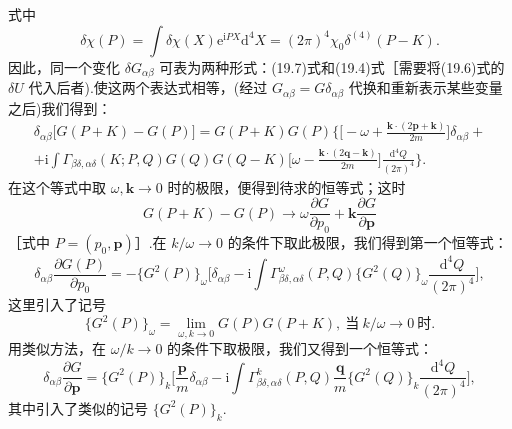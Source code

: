 式中
\begin{equation*}
  \delta\chi(P)=\int\delta\chi(X)\mathrm{e}^{\mathrm{i}PX}\mathrm{d}^4X=(2\pi)^4\chi_0\delta^{(4)}(P-K).
\end{equation*}
因此，同一个变化 $\delta G_{\alpha\beta}$ 可表为两种形式：(19.7)式和(19.4)式［需要将(19.6)式的 $\delta U$ 代入后者).使这两个表达式相等，(经过 $G_{\alpha\beta}=G\delta_{\alpha\beta}$ 代换和重新表示某些变量之后)我们得到：
\begin{equation*}
\begin{aligned}
  \delta_{\alpha\beta}\bigl[G(P+K)-G(P)\bigr]=G(P+K)G(P)\biggl\{\biggl[-\omega+\frac{\bm{k}\cdot(2\bm{p}+\bm{k})}{2m}\biggr]\delta_{\alpha\beta}+\\
  +\mathrm{i}\int\Gamma_{\beta\delta,\alpha\delta}(K;P,Q)G(Q)G(Q-K)\biggl[\omega-\frac{\bm{k}\cdot(2\bm{q}-\bm{k})}{2m}\biggr]\frac{\mathrm{d}^4Q}{(2\pi)^4}\biggr\}.
\end{aligned}
\end{equation*}
在这个等式中取 $\omega,\bm{k}\to0$ 时的极限，便得到待求的恒等式；这时
\begin{equation}
  G(P+K)-G(P)\longrightarrow\omega\frac{\partial G}{\partial p_0}+\bm{k}\frac{\partial G}{\partial\bm{p}}
\end{equation}
［式中 $P=(p_0,\bm{p})$］.在 $k/\omega\to0$ 的条件下取此极限，我们得到第一个恒等式：
\begin{equation}
  \delta_{\alpha\beta}\frac{\partial G(P)}{\partial p_0}
  =-\bigl\{G^2(P)\bigr\}_{\omega}\biggl[\delta_{\alpha\beta}-\mathrm{i}\int\Gamma^{\omega}_{\beta\delta,\alpha\delta}(P,Q)\bigl\{G^2(Q)\bigr\}_{\omega}\frac{\mathrm{d}^4Q}{(2\pi)^4}\biggr],
\end{equation}
这里引入了记号
\begin{equation}
  \bigl\{G^2(P)\bigr\}_{\omega}=\lim_{\omega,k\to0}G(P)G(P+K),\ \text{当}\ k/\omega\to0\ \text{时}.
\end{equation}
用类似方法，在 $\omega/k\to0$ 的条件下取极限，我们又得到一个恒等式：
\begin{equation}
  \delta_{\alpha\beta}\frac{\partial G}{\partial\bm{p}}
  =\bigl\{G^2(P)\bigr\}_{k}\biggl[\frac{\bm{p}}{m}\delta_{\alpha\beta}-\mathrm{i}\int\Gamma^{k}_{\beta\delta,\alpha\delta}(P,Q)\frac{\bm{q}}{m}\bigl\{G^2(Q)\bigr\}_{k}\frac{\mathrm{d}^4Q}{(2\pi)^4}\biggr],
\end{equation}
其中引入了类似的记号 $\{G^2(P)\}_k$.

